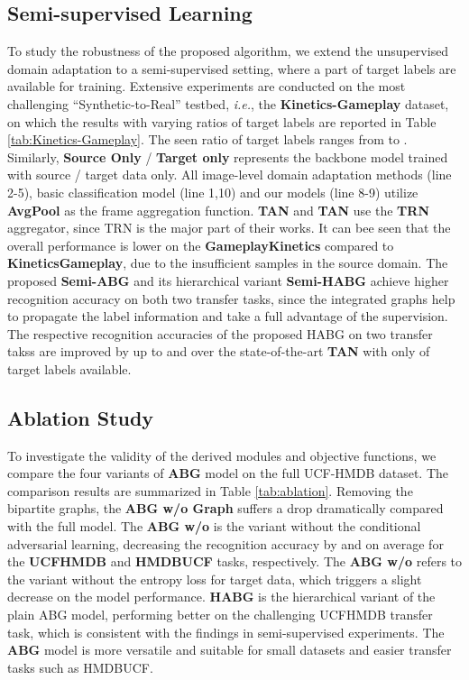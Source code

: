 \subsection{Semi-supervised Learning}
To study the robustness of the proposed algorithm, we extend the unsupervised domain adaptation to a semi-supervised setting, where a part of target labels are available for training. Extensive experiments are conducted on the most challenging ``Synthetic-to-Real'' testbed, \textit{i.e.}, the \textbf{Kinetics-Gameplay} dataset, on which the results with varying ratios of target labels are reported in Table \ref{tab:Kinetics-Gameplay}. The seen ratio of target labels ranges from  to . Similarly, \textbf{Source Only} / \textbf{Target only} represents the backbone model trained with source / target data only. All image-level domain adaptation methods (line 2-5), basic classification model (line 1,10) and our models (line 8-9) utilize \textbf{AvgPool} as the frame aggregation function. \textbf{TAN} and \textbf{TAN} use the \textbf{TRN} aggregator, since TRN is the major part of their works. It can bee seen that the overall performance is lower on the \textbf{GameplayKinetics} compared to \textbf{KineticsGameplay}, due to the insufficient samples in the source domain. The proposed \textbf{Semi-ABG} and its hierarchical variant \textbf{Semi-HABG} achieve higher recognition accuracy on both two transfer tasks, since the integrated graphs help to propagate the label information and take a full advantage of the supervision. The respective recognition accuracies of the proposed HABG on two transfer takss are improved by up to  and  over the state-of-the-art \textbf{TAN} with only  of target labels available.


\vspace{-0.3cm}
\subsection{Ablation Study}
To investigate the validity of the derived modules and objective functions, we compare the four variants of \textbf{ABG} model on the full UCF-HMDB dataset. The comparison results are summarized in Table \ref{tab:ablation}. Removing the bipartite graphs, the \textbf{ABG w/o Graph} suffers a drop dramatically compared with the full model. The \textbf{ABG w/o } is the variant without the conditional adversarial learning, decreasing the recognition accuracy by  and  on average for the \textbf{UCFHMDB} and\textbf{ HMDBUCF} tasks, respectively. The \textbf{ABG w/o } refers to the variant without the entropy loss for target data, which triggers a slight decrease on the model performance. \textbf{HABG} is the hierarchical variant of the plain ABG model, performing better on the challenging UCFHMDB transfer task, which is consistent with the findings in semi-supervised experiments. The \textbf{ABG} model is more versatile and suitable for small datasets and easier transfer tasks such as HMDBUCF.

